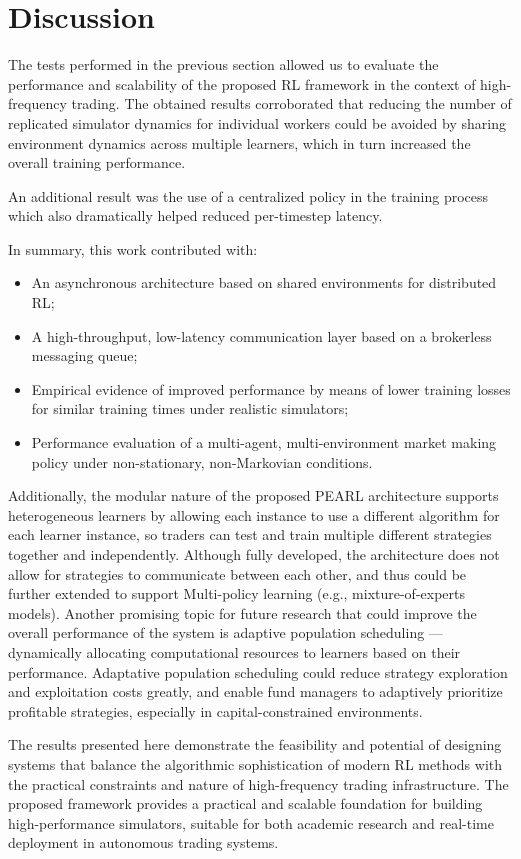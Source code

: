 \section{Discussion}
\label{sec:discussion}

The tests performed in the previous section allowed us to evaluate the performance and scalability of the proposed RL framework in the context of high-frequency trading.
The obtained results corroborated that reducing the number of replicated simulator dynamics for individual workers could be avoided
by sharing environment dynamics across multiple learners, which in turn increased the overall training performance.

An additional result was the use of a centralized policy in the training process which also dramatically helped reduced per-timestep latency.

In summary, this work contributed with:
\begin{itemize}
    \item An asynchronous architecture based on shared environments for distributed RL;
    \item A high-throughput, low-latency communication layer based on a brokerless messaging queue;
    \item Empirical evidence of improved performance by means of lower training losses for similar training times under realistic simulators;
    \item Performance evaluation of a multi-agent, multi-environment market making policy under non-stationary, non-Markovian conditions.
\end{itemize}

Additionally, the modular nature of the proposed PEARL architecture supports heterogeneous learners by allowing each instance to use a different algorithm
for each learner instance, so traders can test and train multiple different strategies together and independently.
Although fully developed, the architecture does not allow for strategies to communicate between each other,
and thus could be further extended to support Multi-policy learning (e.g., mixture-of-experts models).
Another promising topic for future research that could improve the overall performance of the system is adaptive population scheduling
—dynamically allocating computational resources to learners based on their performance.
Adaptative population scheduling could reduce strategy exploration and exploitation costs greatly,
and enable fund managers to adaptively prioritize profitable strategies, especially in capital-constrained environments.

The results presented here demonstrate the feasibility and potential of designing systems that balance the algorithmic sophistication of
modern RL methods with the practical constraints and nature of high-frequency trading infrastructure.
The proposed framework provides a practical and scalable foundation for building high-performance simulators,
suitable for both academic research and real-time deployment in autonomous trading systems.
